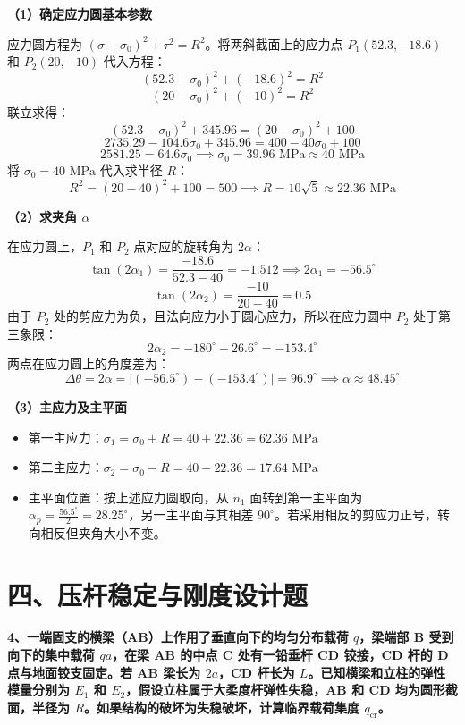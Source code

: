 \documentclass[11pt,a4paper]{ctexrep}
\begin{document}
{\textbf{（1）确定应力圆基本参数}

应力圆方程为 $(\sigma - \sigma_0)^2 + \tau^2 = R^2$。将两斜截面上的应力点 $P_1(52.3, -18.6)$ 和 $P_2(20, -10)$ 代入方程：
\[
    (52.3 - \sigma_0)^2 + (-18.6)^2 = R^2
\]
\[
    (20 - \sigma_0)^2 + (-10)^2 = R^2
\]
联立求得：
\[
    (52.3 - \sigma_0)^2 + 345.96 = (20 - \sigma_0)^2 + 100
\]
\[
    2735.29 - 104.6 \sigma_0 + 345.96 = 400 - 40 \sigma_0 + 100
\]
\[
    2581.25 = 64.6 \sigma_0 \implies \sigma_0 = 39.96\text{ MPa} \approx 40\text{ MPa}
\]
将 $\sigma_0 = 40\text{ MPa}$ 代入求半径 $R$：
\[
    R^2 = (20 - 40)^2 + 100 = 500 \implies R = 10\sqrt{5} \approx 22.36\text{ MPa}
\]

\textbf{（2）求夹角 $\alpha$}

在应力圆上，$P_1$ 和 $P_2$ 点对应的旋转角为 $2\alpha$：
\[
    \tan(2\alpha_1) = \frac{-18.6}{52.3 - 40} = -1.512 \implies 2\alpha_1 = -56.5^\circ
\]
\[
    \tan(2\alpha_2) = \frac{-10}{20 - 40} = 0.5
\]
由于 $P_2$ 处的剪应力为负，且法向应力小于圆心应力，所以在应力圆中 $P_2$ 处于第三象限：
\[
    2\alpha_2 = -180^\circ + 26.6^\circ = -153.4^\circ
\]
两点在应力圆上的角度差为：
\[
    \Delta \theta = 2\alpha = |(-56.5^\circ) - (-153.4^\circ)| = 96.9^\circ \implies \alpha \approx 48.45^\circ
\]

\textbf{（3）主应力及主平面}
\begin{itemize}
    \item 第一主应力：$\sigma_1 = \sigma_0 + R = 40 + 22.36 = 62.36\text{ MPa}$
    \item 第二主应力：$\sigma_2 = \sigma_0 - R = 40 - 22.36 = 17.64\text{ MPa}$
    \item 主平面位置：按上述应力圆取向，从 $n_1$ 面转到第一主平面为 $\alpha_p = \frac{56.5^\circ}{2} = 28.25^\circ$，另一主平面与其相差 $90^\circ$。若采用相反的剪应力正号，转向相反但夹角大小不变。
\end{itemize}




\section*{四、压杆稳定与刚度设计题}

\textbf{4、一端固支的横梁（AB）上作用了垂直向下的均匀分布载荷 $q$，梁端部 B 受到向下的集中载荷 $qa$，在梁 AB 的中点 C 处有一铅垂杆 CD 铰接，CD 杆的 D 点与地面铰支固定。若 AB 梁长为 $2a$，CD 杆长为 $L$。已知横梁和立柱的弹性模量分别为 $E_1$ 和 $E_2$，假设立柱属于大柔度杆弹性失稳，AB 和 CD 均为圆形截面，半径为 $R$。如果结构的破坏为失稳破坏，计算临界载荷集度 $q_{\text{cr}}$。}

}
\end{document}
